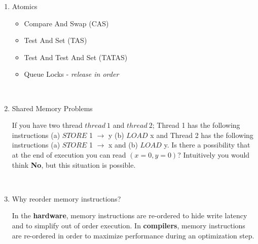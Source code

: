 \documentclass[12pt]{article}
\newenvironment{QandA}{\begin{enumerate}[label=\bfseries\arabic*.]\bfseries}
                      {\end{enumerate}}
\newenvironment{answered}{\par\quad\normalfont}{}
\begin{document}
\begin{QandA}
\begin{answered}
\textit{Note:} Always acquire multiple locks in the same order. Acquiring locks in random order increases the risk of arriving at a deadlock condition - \textit{Dining Philosophers}. 
\end{answered}

\ 

\item Atomics
\begin{answered}
\vspace{-0.85cm}
\begin{itemize}
    \item Compare And Swap (CAS)
    \item Test And Set (TAS)
    \item Test And Test And Set (TATAS)
    \item Queue Locks - \textit{release in order} 
\end{itemize}
\end{answered}

\ 

\item Shared Memory Problems
\begin{answered}
If you have two thread $thread\ 1$ and $thread\ 2$; Thread 1 has the following instructions (a) $STORE$ 1 $\rightarrow$ y (b) $LOAD$ x and Thread 2 has the following instructions (a) $STORE$ 1 $\rightarrow$ x and (b) $LOAD$ y. Is there a possibility that at the end of execution you can read $(x=0,y=0)$? Intuitively you would think \textbf{No}, but this situation is possible. 
\end{answered}

\ 

\item Why reorder memory instructions?
\begin{answered}
In the \textbf{hardware}, memory instructions are re-ordered to hide write latency and to simplify out of order execution. In \textbf{compilers}, memory instructions are re-ordered in order to maximize performance during an optimization step.
\end{answered}

\ 


\end{QandA}
\end{document}
